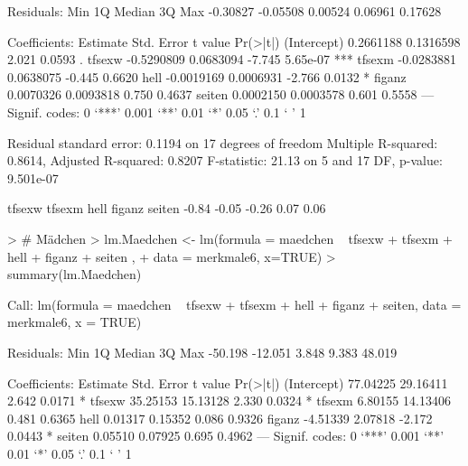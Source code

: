 \begin{Schunk}
\begin{Soutput}
Residuals:
     Min       1Q   Median       3Q      Max 
-0.30827 -0.05508  0.00524  0.06961  0.17628 

Coefficients:
              Estimate Std. Error t value Pr(>|t|)    
(Intercept)  0.2661188  0.1316598   2.021   0.0593 .  
tfsexw      -0.5290809  0.0683094  -7.745 5.65e-07 ***
tfsexm      -0.0283881  0.0638075  -0.445   0.6620    
hell        -0.0019169  0.0006931  -2.766   0.0132 *  
figanz       0.0070326  0.0093818   0.750   0.4637    
seiten       0.0002150  0.0003578   0.601   0.5558    
---
Signif. codes:  0 ‘***’ 0.001 ‘**’ 0.01 ‘*’ 0.05 ‘.’ 0.1 ‘ ’ 1 

Residual standard error: 0.1194 on 17 degrees of freedom
Multiple R-squared: 0.8614,	Adjusted R-squared: 0.8207 
F-statistic: 21.13 on 5 and 17 DF,  p-value: 9.501e-07 
\end{Soutput}
\begin{Soutput}
tfsexw tfsexm   hell figanz seiten 
 -0.84  -0.05  -0.26   0.07   0.06 
\end{Soutput}
\begin{Sinput}
> # Mädchen
> lm.Maedchen <- lm(formula = maedchen ~ tfsexw + tfsexm + hell +  figanz  +  seiten  , 
+   data = merkmale6, x=TRUE)
> summary(lm.Maedchen)
\end{Sinput}
\begin{Soutput}
Call:
lm(formula = maedchen ~ tfsexw + tfsexm + hell + figanz + seiten, 
    data = merkmale6, x = TRUE)

Residuals:
    Min      1Q  Median      3Q     Max 
-50.198 -12.051   3.848   9.383  48.019 

Coefficients:
            Estimate Std. Error t value Pr(>|t|)  
(Intercept) 77.04225   29.16411   2.642   0.0171 *
tfsexw      35.25153   15.13128   2.330   0.0324 *
tfsexm       6.80155   14.13406   0.481   0.6365  
hell         0.01317    0.15352   0.086   0.9326  
figanz      -4.51339    2.07818  -2.172   0.0443 *
seiten       0.05510    0.07925   0.695   0.4962  
---
Signif. codes:  0 ‘***’ 0.001 ‘**’ 0.01 ‘*’ 0.05 ‘.’ 0.1 ‘ ’ 1 


\end{Soutput}
\end{Schunk}

